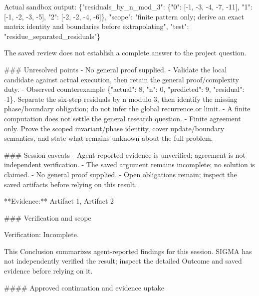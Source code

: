 \documentclass[11pt]{article}
\begin{document}
Actual sandbox output: \{"residuals\_by\_n\_mod\_3": \{"0": [-1, -3, -4, -7, -11], "1": [-1, -2, -3, -5], "2": [-2, -2, -4, -6]\}, "scope": "finite pattern only; derive an exact matrix identity and boundaries before extrapolating", "test": "residue\_separated\_residuals"\}

The saved review does not establish a complete answer to the project question.

\#\#\# Unresolved points
- No general proof supplied.
- Validate the local candidate against actual execution, then retain the general proof/complexity duty.
- Observed counterexample \{"actual": 8, "n": 0, "predicted": 9, "residual": -1\}. Separate the six-step residuals by n modulo 3, then identify the missing phase/boundary obligation; do not infer the global recurrence or limit.
- A finite computation does not settle the general research question.
- Finite agreement only. Prove the scoped invariant/phase identity, cover update/boundary semantics, and state what remains unknown about the full problem.

\#\#\# Session caveats
- Agent-reported evidence is unverified; agreement is not independent verification.
- The saved argument remains incomplete; no solution is claimed.
- No general proof supplied.
- Open obligations remain; inspect the saved artifacts before relying on this result.

**Evidence:** Artifact 1, Artifact 2

\#\#\# Verification and scope

Verification: Incomplete.

This Conclusion summarizes agent-reported findings for this session. SIGMA has not independently verified the result; inspect the detailed Outcome and saved evidence before relying on it.

\#\#\#\# Approved continuation and evidence uptake
\end{document}
